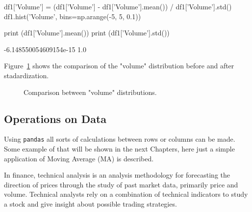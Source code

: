 \begin{ipython}
\begin{ipython}
df1['Volume'] = (df1['Volume'] - df1['Volume'].mean()) / df1['Volume'].std()
df1.hist('Volume', bins=np.arange(-5, 5, 0.1))

print (df1['Volume'].mean())
print (df1['Volume'].std())
\end{ipython}
\begin{ioutput}
-6.148550054609154e-15
1.0
\end{ioutput}

Figure~\ref{fig:standardization} shows the comparison of the "volume" distribution before and after stadardization.

\begin{figure}[htb]
	\centering
	\caption{Comparison between "volume" distributions.}
	\label{fig:standardization}
\end{figure}

\subsection{Operations on Data}
Using \texttt{pandas} all sorts of calculations between rows or columns can be made. Some example of that will be shown in the next Chapters, here just a simple application of Moving Average (MA) is described.

In finance, technical analysis is an analysis methodology for forecasting the direction of prices through the study of past market data, primarily price and volume. Technical analysts rely on a combination of technical indicators to study a stock and give insight about possible trading strategies. 


\end{ipython}
